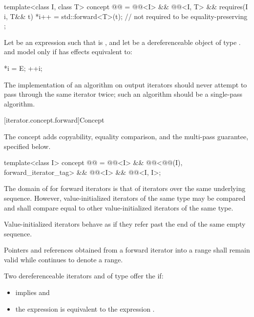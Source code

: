 \begin{codeblock}
template<class I, class T>
  concept @@ =
    @@<I> &&
    @@<I, T> &&
    requires(I i, T&& t) {
      *i++ = std::forward<T>(t);        // not required to be equality-preserving
    };
\end{codeblock}

\pnum
Let  be an expression such that  is , and let  be a
dereferenceable object of type .  and  model  only if
 has effects equivalent to:
\begin{codeblock}
*i = E;
++i;
\end{codeblock}

\pnum
\recommended
The implementation of an algorithm on output iterators
should never attempt to pass through the same iterator twice;
such an algorithm should be a single-pass algorithm.

[iterator.concept.forward]{Concept }

\pnum
The  concept adds
copyability, equality comparison, and
the multi-pass guarantee, specified below.

\begin{codeblock}
template<class I>
  concept @@ =
    @@<I> &&
    @@<@@(I), forward_iterator_tag> &&
    @@<I> &&
    @@<I, I>;
\end{codeblock}

\pnum
The domain of \tcode{==} for forward iterators is that of iterators over the same
underlying sequence. However, value-initialized iterators of the same type
may be compared and shall compare equal to other value-initialized iterators of the same type.
\begin{note}
Value-initialized iterators behave as if they refer past the end of the same
empty sequence.
\end{note}

\pnum
Pointers and references obtained from a forward iterator into a range 
shall remain valid while  continues to denote a range.

\pnum
Two dereferenceable iterators  and  of type 
offer the  if:
\begin{itemize}
\item {} implies  and
\item the expression
 is equivalent to the expression .
\end{itemize}

